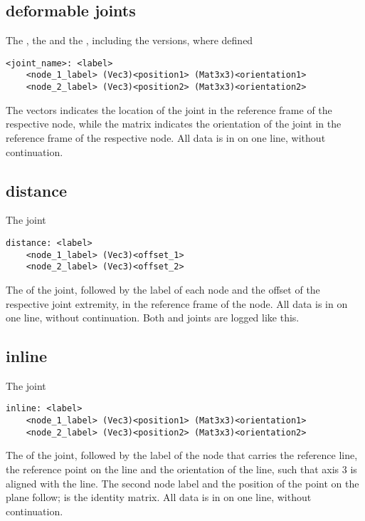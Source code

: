 \subsection{deformable joints}
The , the 
and the , including the 
versions, where defined
\begin{verbatim}
<joint_name>: <label>
    <node_1_label> (Vec3)<position1> (Mat3x3)<orientation1>
    <node_2_label> (Vec3)<position2> (Mat3x3)<orientation2>
\end{verbatim}
The  vectors indicates the location of the joint
in the reference frame of the respective node,
while the matrix  indicates the orientation of the joint
in the reference frame of the respective node.
All data is in on one line, without continuation.

\subsection{distance}
The  joint
\begin{verbatim}
distance: <label>
    <node_1_label> (Vec3)<offset_1>
    <node_2_label> (Vec3)<offset_2>
\end{verbatim}
The  of the joint, followed by the label of each node
and the offset of the respective joint extremity,
in the reference frame of the node.
All data is in on one line, without continuation.
Both  and  joints are logged
like this.

\subsection{inline}
The  joint
\begin{verbatim}
inline: <label>
    <node_1_label> (Vec3)<position1> (Mat3x3)<orientation1>
    <node_2_label> (Vec3)<position2> (Mat3x3)<orientation2>
\end{verbatim}
The  of the joint, followed by the label of the node
that carries the reference line, the reference point 
on the line and the orientation  of the line,
such that axis 3 is aligned with the line.
The second node label and the position of the point on the plane
follow;  is the identity matrix.
All data is in on one line, without continuation.

